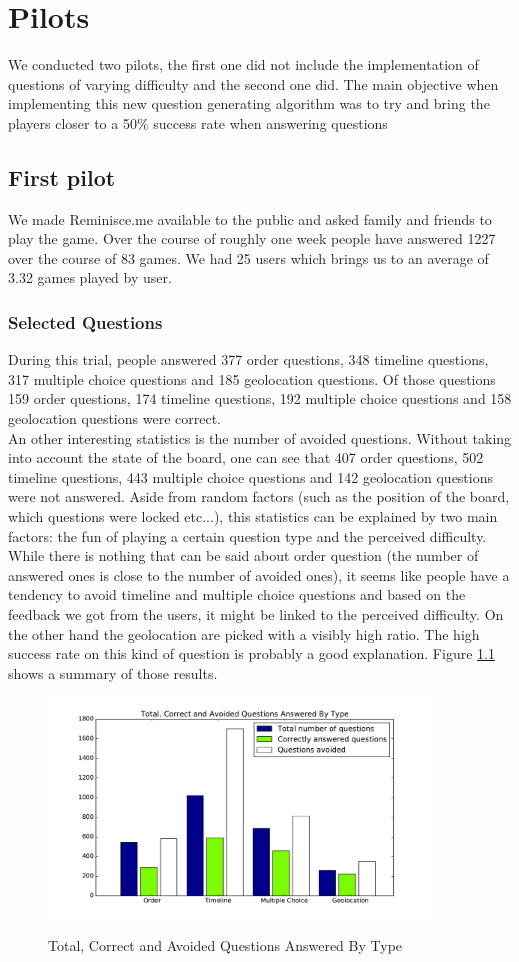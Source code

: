 \chapter{Pilots}
We conducted two pilots, the first one did not include the implementation of questions of varying difficulty and the second one did. The main objective when implementing this new question generating algorithm was to try and bring the players closer to a 50\% success rate when answering questions
\section{First pilot}\label{sec:pilot1}
We made Reminisce.me available to the public and asked family and friends to play the game. Over the course of roughly one week people have answered 1227 over the course of 83 games. We had 25 users which brings us to an average of 3.32 games played by user.
\subsection{Selected Questions}
During this trial, people answered 377 order questions, 348 timeline questions, 317 multiple choice questions and 185 geolocation questions. Of those questions 159 order questions, 174 timeline questions, 192 multiple choice questions and 158 geolocation questions were correct.\\
An other interesting statistics is the number of avoided questions. Without taking into account the state of the board, one can see that 407 order questions, 502 timeline questions, 443 multiple choice questions and 142 geolocation questions were not answered. Aside from random factors (such as the position of the board, which questions were locked etc...), this statistics can be explained by two main factors: the fun of playing a certain question type and the perceived difficulty. While there is nothing that can be said about order question (the number of answered ones is close to the number of avoided ones), it seems like people have a tendency to avoid timeline and multiple choice questions and based on the feedback we got from the users, it might be linked to the perceived difficulty. On the other hand the geolocation are picked with a visibly high ratio. The high success rate on this kind of question is probably a good explanation. Figure \ref{fig:p1TotCorrectAvoid} shows a summary of those results.
\begin{figure}
\centering
{\includegraphics[width=4in]{images/pilot_1_selected_questions.pdf}}
\caption{Total, Correct and Avoided Questions Answered By Type}
\label{fig:p1TotCorrectAvoid}
\end{figure}
